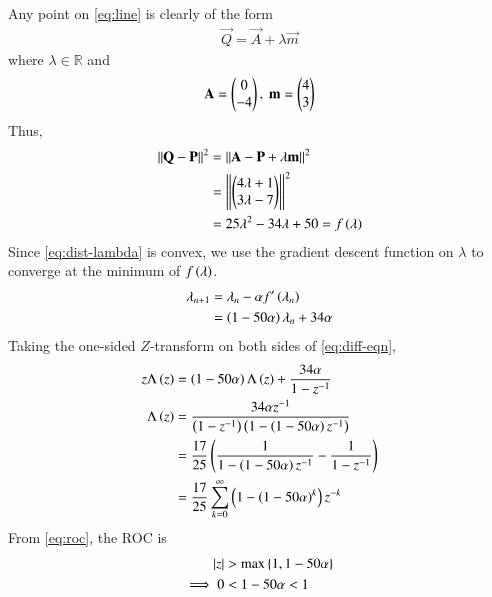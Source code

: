 \documentclass[journal,12pt,twocolumn]{IEEEtran}
\begin{document}
\begin{enumerate}
    \solution Any point on \eqref{eq:line} is clearly of the form
    \begin{align}
        \vec{Q} = \vec{A} + \lambda\vec{m}
        \label{eq:Q-def}
    \end{align}
    where $\lambda \in \mathbb{R}$ and
    \begin{align}
        \mathbf{A} = \begin{pmatrix}0\\-4\end{pmatrix},\ \mathbf{m} = \begin{pmatrix}4\\3\end{pmatrix}
    \end{align}
    Thus,
    \begin{align}
        \left\lVert\mathbf{Q}-\mathbf{P}\right\rVert^2 &= \left\lVert\mathbf{A}-\mathbf{P}+\lambda\mathbf{m}\right\rVert^2 \\
                                 &= \left\lVert\begin{pmatrix}4\lambda+1\\3\lambda-7\end{pmatrix}\right\rVert^2 \\
                                 &= 25\lambda^2-34\lambda+50 = f\left(\lambda\right)
                                 \label{eq:dist-lambda}
    \end{align}
    Since \eqref{eq:dist-lambda} is convex, we use the gradient descent function 
    on $\lambda$ to converge at the minimum of $f\left(\lambda\right)$.
    \begin{align}
        \lambda_{n+1} &= \lambda_n - \alpha f'\left(\lambda_n\right) \\
                      &= \left(1-50\alpha\right)\lambda_n + 34\alpha
                      \label{eq:diff-eqn}
    \end{align}
    Taking the one-sided $Z$-transform on both sides of \eqref{eq:diff-eqn},
    \begin{align}
        z\Lambda\left(z\right) &= \left(1-50\alpha\right)\Lambda\left(z\right) + \frac{34\alpha}{1-z^{-1}} \\
        \Lambda\left(z\right) &= \frac{34\alpha z^{-1}}{\left(1- z^{-1}\right)\left(1 - \left(1-50\alpha\right)z^{-1}\right)} \label{eq:roc} \\
                                 &= \frac{17}{25}\left(\frac{1}{1-\left(1-50\alpha\right)z^{-1}}-\frac{1}{1-z^{-1}}\right) \\
                                 &= \frac{17}{25}\sum_{k=0}^{\infty}\left(1-\left(1-50\alpha\right)^k\right)z^{-k}
                                 \label{eq:lambda-z-trans}
    \end{align}
    From \eqref{eq:roc}, the ROC is
    \begin{align}
        \abs{z} &> \max\cbrak{1,1-50\alpha} \\
        \implies 0 &< 1 - 50\alpha < 1 \\

\end{align}
\end{enumerate}
\end{document}
